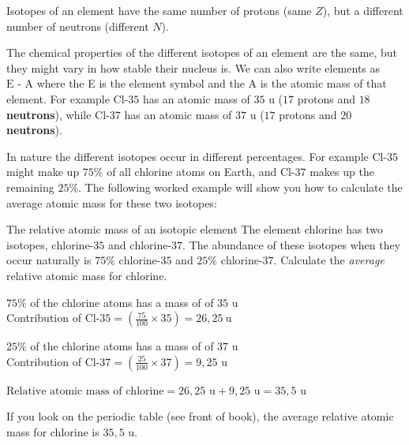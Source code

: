  { Isotopes of an element have the same number of protons (same $Z$), but a different number of neutrons (different $N$).} 

\label{m38753*id257405} The chemical properties of the different isotopes of an element are the same, but they might vary in how stable their nucleus is. We can also write elements as $\text{E - A}$ where the E is the element symbol and the A is the atomic mass of that element. For example $\text{Cl-}35$ has an atomic mass of $35 \text{ u}$ ($17$ protons and \textbf{$18$ neutrons}), while $\text{Cl-}37$ has an atomic mass of $37 \text{ u}$ ($17$ protons and \textbf{$20$ neutrons}).\par 
\label{m38753*notfhsst!!!underscore!!!id393}


\label{m38753*id248557}In nature the different isotopes occur in different percentages. For example $\text{Cl-}35$ might make up $75\%$ of all chlorine atoms on Earth, and $\text{Cl-}37$ makes up the remaining $25\%$. The following worked example will show you how to calculate the average atomic mass for these two isotopes: \par    
\begin{wex}{The relative atomic mass of an isotopic element}{
The element chlorine has two isotopes, $\text{chlorine-}35$ and $\text{chlorine-}37$. The abundance of these isotopes when they occur naturally is $75\% \text{ chlorine-}35$ and $25\% \text{ chlorine-}37$. Calculate the \textit{average} relative atomic mass for chlorine.
}
{
$75\%$ of the chlorine atoms has a mass of of $35 \text{ u}$ \\
Contribution of $\text{Cl-}35 = (\frac{75}{100} \times 35) = 26,25~\text{u}$

$25\%$ of the chlorine atoms has a mass of of $37 \text{ u}$ \\ 
Contribution of $\text{Cl-}37 = (\frac{25}{100} \times 37) = 9,25 \text{ u}$



$\text{Relative atomic mass of chlorine} = 26,25\text{ u} + 9,25\text{ u} = 35,5\text{ u}$ \\
}
\end{wex}
If you look on the periodic table (see front of book), the average relative atomic mass for chlorine is $35,5 \text{ u}$.  \par

